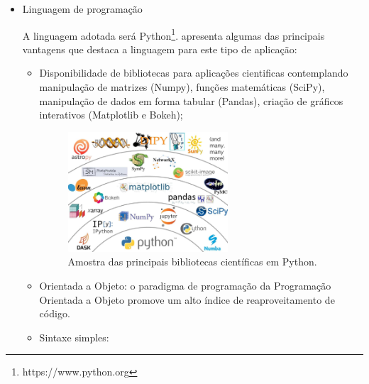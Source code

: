 \begin{itemize}

\item Linguagem de programação

A linguagem adotada será Python\footnote{https://www.python.org}.  apresenta algumas das principais vantagens que destaca a linguagem para este tipo de aplicação:

\begin{itemize}
    \item Disponibilidade de bibliotecas para aplicações cientificas contemplando manipulação de matrizes (Numpy), funções matemáticas (SciPy), manipulação de dados em forma tabular (Pandas), criação de gráficos interativos (Matplotlib e Bokeh);
    
    \begin{figure}[!ht]
        \centering
        \includegraphics[width=0.6\textwidth]{imagens/python_ecosystem}
        \caption[]{Amostra das principais bibliotecas científicas em Python.}\label{fig:python_ecosystem}
    \end{figure}

    \item Orientada a Objeto: o paradigma de programação da Programação Orientada a Objeto promove um alto índice de reaproveitamento de código.
    
    \item Sintaxe simples: 
\end{itemize}


\end{itemize}
